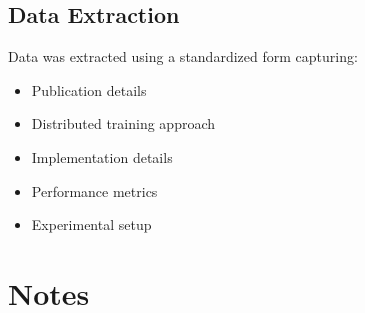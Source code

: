 \subsection{Data Extraction}
Data was extracted using a standardized form capturing:
\begin{itemize}
    \item Publication details
    \item Distributed training approach
    \item Implementation details
    \item Performance metrics
    \item Experimental setup
\end{itemize} 


\section{Notes}

